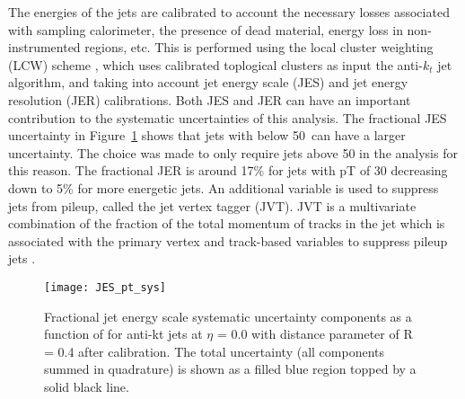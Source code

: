 The energies of the jets are calibrated to  account the necessary losses associated with sampling calorimeter,
the presence of dead material,  energy loss in non-instrumented regions, etc. This is performed using the local cluster weighting
(LCW) scheme \cite{Aad:2016upyew}, which uses calibrated toplogical clusters as input the anti-$k_{t}$ jet algorithm,
and taking into account jet energy scale (JES) and jet energy resolution (JER) calibrations.
Both JES and JER can have an important contribution to the systematic uncertainties of this analysis.
The fractional JES uncertainty in Figure~\ref{fig:exp.JES_pt_sys} shows that jets with \pt below 50\GeV~can have a larger uncertainty.
The choice was made to only require jets above 50 \GeV in the analysis for this reason.
The fractional JER is around 17\% for jets with pT of 30 \GeV decreasing down to 5\% for more energetic jets.
An additional variable is used to suppress jets from pileup, called the jet vertex tagger (JVT).
JVT is a multivariate combination of the fraction of the total momentum of tracks in the jet which is associated with the primary vertex
and  track-based variables to suppress pileup jets \cite{ATL-PHYS-PUB-2015-034}. 

\begin{figure}[t!]
\centering
\texttt{[image: JES\_pt\_sys]}
\caption{Fractional jet energy scale systematic uncertainty components as a function of \pt for anti-kt jets at $\eta$ = 0.0 with distance parameter of R = 0.4 after calibration.
The total uncertainty (all components summed in quadrature) is shown as a filled blue region topped by a solid black line.}
\label{fig:exp.JES_pt_sys}
\end{figure} 


